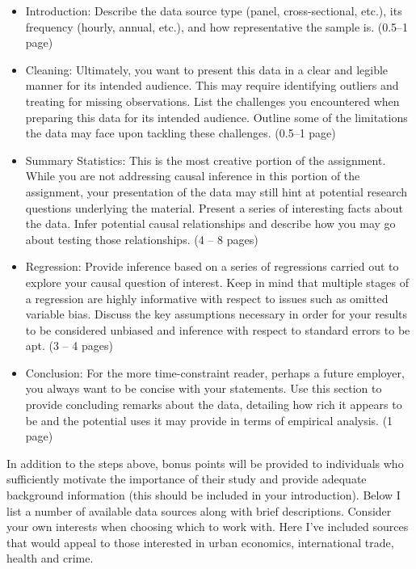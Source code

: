 \documentclass[addpoints, 12pt]{exam}
\begin{document}
\begin{itemize}
	\setlength{\itemsep}{0pt}
	\item Introduction: Describe the data source type (panel, cross-sectional, etc.), its frequency (hourly, annual, etc.), and how representative the sample is. (0.5--1 page)
	\item Cleaning: Ultimately, you want to present this data in a clear and legible manner for its intended audience. 
	This may require identifying outliers and treating for missing observations. 
	List the challenges you encountered when preparing this data for its intended audience. Outline some of the limitations the data may face upon tackling these challenges. (0.5--1 page)
	\item Summary Statistics: This is the most creative portion of the assignment. 
	While you are not addressing causal inference in this portion of the assignment, your presentation of the data may still hint at potential research questions underlying the material. 
	Present a series of interesting facts about the data. 
	Infer potential causal relationships and describe how you may go about testing those relationships. (4 -- 8 pages)
	\item Regression: Provide inference based on a series of regressions carried out to explore your causal question of interest. Keep in mind that multiple stages of a regression are highly informative with respect to issues such as omitted variable bias.
	Discuss the key assumptions necessary in order for your results to be considered unbiased and inference with respect to standard errors to be apt. (3 -- 4 pages)
	\item Conclusion: For the more time-constraint reader, perhaps a future employer, you always want to be concise with your statements. Use this section to provide concluding remarks about the data, detailing how rich it appears to be and the potential uses it may provide in terms of empirical analysis. (1 page)
\end{itemize}

In addition to the steps above, bonus points will be provided to individuals who sufficiently motivate the importance of their study and provide adequate background information (this should be included in your introduction). 
Below I list a number of available data sources along with brief descriptions. 
Consider your own interests when choosing which to work with. 
Here I've included sources that would appeal to those interested in urban economics, international trade, health and crime.
\end{document}
